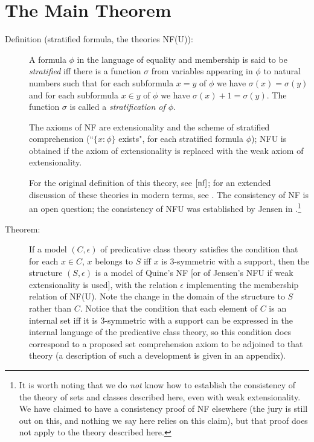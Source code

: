 \documentclass[12pt]{article}
\begin{document}
\newpage

\section{The Main Theorem}

\begin{description}

\item[Definition (stratified formula, the theories NF(U)):]  A formula $\phi$ in the language of equality and membership is said to be {\em stratified\/}
iff there is a function $\sigma$ from variables appearing in $\phi$ to natural numbers such that for each subformula $x=y$ of $\phi$ we have
$\sigma(x)=\sigma(y)$ and for each subformula $x \in y$ of $\phi$ we have $\sigma(x)+1=\sigma(y)$.  The function $\sigma$ is called a {\em stratification of $\phi$\/}.

The axioms of NF are extensionality and the scheme of stratified comprehension (``$\{x : \phi\}$ exists", for each stratified formula $\phi$);  NFU is obtained if the axiom of extensionality is replaced with the weak axiom of extensionality.

For the original definition of this theory, see $\cite{nf}$; for an extended discussion of these theories in modern terms, see \cite{forsterbook}.  The consistency of NF is an open question;  the consistency of NFU was established by Jensen in \cite{jensen}.\footnote{It is worth noting that we do {\em not\/} know how to establish the consistency of the theory of sets and classes described here, even with weak extensionality.  We have claimed to have a consistency proof of NF elsewhere (the jury is still out on this, and nothing we say here relies on this claim), but that proof does not apply to the theory described here.}

\item[Theorem:]  If a model $(C,\epsilon)$ of predicative class theory satisfies the condition that for each $x \in C$, $x$ belongs to $S$ iff $x$ is 3-symmetric with a support, then the structure $(S,\epsilon)$ is a model of Quine's NF [or of Jensen's NFU if weak extensionality is used], with the relation $\epsilon$ implementing the membership relation of NF(U).  Note the change in the domain of the structure to $S$ rather than $C$.  Notice that the condition that each element of $C$  is an internal set iff it is 3-symmetric with a support can be expressed in the internal language of the predicative class theory, so this condition does correspond to a proposed set comprehension axiom to be adjoined to that theory (a description of such a development is given in an appendix).


\end{description}
\end{document}
